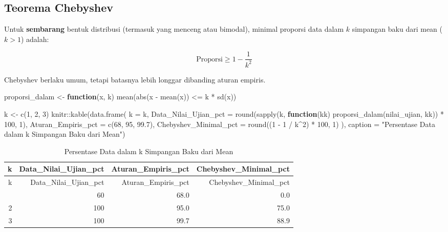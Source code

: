 \documentclass[
  indonesian,
  letterpaper,
]{book}
\newenvironment{Shaded}{\begin{snugshade}}{\end{snugshade}}
\newcommand{\AttributeTok}[1]{\textcolor[rgb]{0.40,0.45,0.13}{#1}}
\newcommand{\ControlFlowTok}[1]{\textcolor[rgb]{0.00,0.23,0.31}{\textbf{#1}}}
\newcommand{\DecValTok}[1]{\textcolor[rgb]{0.68,0.00,0.00}{#1}}
\newcommand{\FloatTok}[1]{\textcolor[rgb]{0.68,0.00,0.00}{#1}}
\newcommand{\FunctionTok}[1]{\textcolor[rgb]{0.28,0.35,0.67}{#1}}
\newcommand{\NormalTok}[1]{\textcolor[rgb]{0.00,0.23,0.31}{#1}}
\newcommand{\OtherTok}[1]{\textcolor[rgb]{0.00,0.23,0.31}{#1}}
\newcommand{\SpecialCharTok}[1]{\textcolor[rgb]{0.37,0.37,0.37}{#1}}
\newcommand{\StringTok}[1]{\textcolor[rgb]{0.13,0.47,0.30}{#1}}
\begin{document}
\subsection{Teorema Chebyshev}\label{teorema-chebyshev}

Untuk \textbf{sembarang} bentuk distribusi (termasuk yang menceng atau
bimodal), minimal proporsi data dalam \(k\) simpangan baku dari mean
(\(k > 1\)) adalah:

\[\text{Proporsi} \geq 1 - \frac{1}{k^2}\]

Chebyshev berlaku umum, tetapi batasnya lebih longgar dibanding aturan
empiris.

\begin{Shaded}
\begin{Highlighting}[]
\NormalTok{proporsi\_dalam }\OtherTok{\textless{}{-}} \ControlFlowTok{function}\NormalTok{(x, k) }\FunctionTok{mean}\NormalTok{(}\FunctionTok{abs}\NormalTok{(x }\SpecialCharTok{{-}} \FunctionTok{mean}\NormalTok{(x)) }\SpecialCharTok{\textless{}=}\NormalTok{ k }\SpecialCharTok{*} \FunctionTok{sd}\NormalTok{(x))}

\NormalTok{k }\OtherTok{\textless{}{-}} \FunctionTok{c}\NormalTok{(}\DecValTok{1}\NormalTok{, }\DecValTok{2}\NormalTok{, }\DecValTok{3}\NormalTok{)}
\NormalTok{knitr}\SpecialCharTok{::}\FunctionTok{kable}\NormalTok{(}\FunctionTok{data.frame}\NormalTok{(}
\AttributeTok{k =}\NormalTok{ k,}
\AttributeTok{Data\_Nilai\_Ujian\_pct  =} \FunctionTok{round}\NormalTok{(}\FunctionTok{sapply}\NormalTok{(k, }\ControlFlowTok{function}\NormalTok{(kk) }\FunctionTok{proporsi\_dalam}\NormalTok{(nilai\_ujian, kk)) }\SpecialCharTok{*} \DecValTok{100}\NormalTok{, }\DecValTok{1}\NormalTok{),}
\AttributeTok{Aturan\_Empiris\_pct    =} \FunctionTok{c}\NormalTok{(}\DecValTok{68}\NormalTok{, }\DecValTok{95}\NormalTok{, }\FloatTok{99.7}\NormalTok{),}
\AttributeTok{Chebyshev\_Minimal\_pct =} \FunctionTok{round}\NormalTok{((}\DecValTok{1} \SpecialCharTok{{-}} \DecValTok{1} \SpecialCharTok{/}\NormalTok{ k}\SpecialCharTok{\^{}}\DecValTok{2}\NormalTok{) }\SpecialCharTok{*} \DecValTok{100}\NormalTok{, }\DecValTok{1}\NormalTok{)}
\NormalTok{), }\AttributeTok{caption =} \StringTok{"Persentase Data dalam k Simpangan Baku dari Mean"}\NormalTok{)}
\end{Highlighting}
\end{Shaded}

\begin{longtable}[]{@{}rrrr@{}}
\caption{Persentase Data dalam k Simpangan Baku dari
Mean}\tabularnewline
\toprule\noalign{}
k & Data\_Nilai\_Ujian\_pct & Aturan\_Empiris\_pct &
Chebyshev\_Minimal\_pct \\
\midrule\noalign{}
\endfirsthead
\toprule\noalign{}
k & Data\_Nilai\_Ujian\_pct & Aturan\_Empiris\_pct &
Chebyshev\_Minimal\_pct \\
\midrule\noalign{}
\endhead
\bottomrule\noalign{}
\endlastfoot
1 & 60 & 68.0 & 0.0 \\
2 & 100 & 95.0 & 75.0 \\
3 & 100 & 99.7 & 88.9 \\
\end{longtable}
\end{document}
